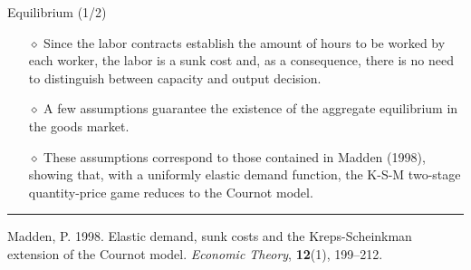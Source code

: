 \documentclass[9pt]{beamer}
\begin{document}
\begin{frame}{Equilibrium (1/2)}

\begin{itemize}

\item[$\diamond$] Since the labor contracts establish the amount of hours to be worked by each worker, the labor is a sunk cost and, as a
consequence, there is no need to distinguish between capacity and output
decision. 

\item[$\diamond$] A few assumptions guarantee the existence of the aggregate equilibrium in the goods market. 

\item[$\diamond$] These assumptions correspond to those contained in Madden (1998), showing that, with a uniformly elastic demand
function, the K-S-M two-stage quantity-price game reduces to the Cournot
model.

\end{itemize}

\bigskip
\bigskip
\scriptsize
\noindent\rule{8cm}{0.4pt}

Madden, P. 1998. Elastic demand, sunk costs and the Kreps-Scheinkman extension of the Cournot model. \emph{Economic Theory}, \textbf{12}(1), 199--212.

\end{frame}
\end{document}
